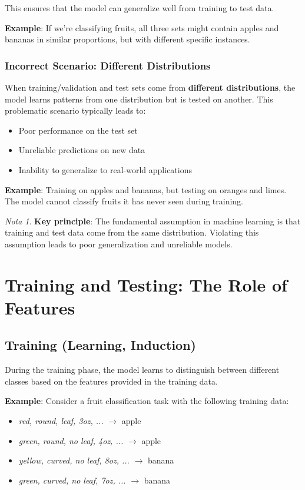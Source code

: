 \documentclass[11pt,a4paper]{article}
\theoremstyle{definition}
\theoremstyle{plain}
\theoremstyle{remark}
\newtheorem*{remark}{Nota}
\begin{document}
This ensures that the model can generalize well from training to test data.

\textbf{Example}: If we're classifying fruits, all three sets might contain apples and bananas in similar proportions, but with different specific instances.

\subsubsection{Incorrect Scenario: Different Distributions}

When training/validation and test sets come from \textbf{different distributions}, the model learns patterns from one distribution but is tested on another. This problematic scenario typically leads to:
\begin{itemize}
    \item Poor performance on the test set
    \item Unreliable predictions on new data
    \item Inability to generalize to real-world applications
\end{itemize}

\textbf{Example}: Training on apples and bananas, but testing on oranges and limes. The model cannot classify fruits it has never seen during training.

\begin{remark}
\textbf{Key principle}: The fundamental assumption in machine learning is that training and test data come from the same distribution. Violating this assumption leads to poor generalization and unreliable models.
\end{remark}

\section{Training and Testing: The Role of Features}

\subsection{Training (Learning, Induction)}

During the training phase, the model learns to distinguish between different classes based on the features provided in the training data. 

\textbf{Example}: Consider a fruit classification task with the following training data:
\begin{itemize}
    \item \textit{red, round, leaf, 3oz, ...} $\rightarrow$ apple
    \item \textit{green, round, no leaf, 4oz, ...} $\rightarrow$ apple
    \item \textit{yellow, curved, no leaf, 8oz, ...} $\rightarrow$ banana
    \item \textit{green, curved, no leaf, 7oz, ...} $\rightarrow$ banana
\end{itemize}
\end{document}
